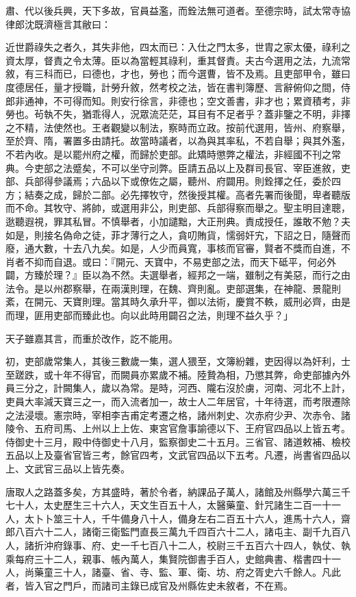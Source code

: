 \begin{pinyinscope}
 肅、代以後兵興，天下多故，官員益濫，而銓法無可道者。至德宗時，試太常寺協律郎沈既濟極言其敝曰：



 近世爵祿失之者久，其失非他，四太而已：入仕之門太多，世胄之家太優，祿利之資太厚，督責之令太薄。臣以為當輕其祿利，重其督責。夫古今選用之法，九流常敘，有三科而已，曰德也，才也，勞也；而今選曹，皆不及焉。且吏部甲令，雖曰度德居任，量才授職，計勞升敘，然考校之法，皆在書判簿歷、言辭俯仰之間，侍郎非通神，不可得而知。則安行徐言，非德也；空文善書，非才也；累資積考，非勞也。茍執不失，猶乖得人，況眾流茫茫，耳目有不足者乎？蓋非鑒之不明，非擇之不精，法使然也。王者觀變以制法，察時而立政。按前代選用，皆州、府察舉，至於齊、隋，署置多由請托。故當時議者，以為與其率私，不若自舉；與其外濫，不若內收。是以罷州府之權，而歸於吏部。此矯時懲弊之權法，非經國不刊之常典。今吏部之法蹙矣，不可以坐守刓弊。臣請五品以上及群司長官、宰臣進敘，吏部、兵部得參議焉；六品以下或僚佐之屬，聽州、府闢用。則銓擇之任，委於四方；結奏之成，歸於二部。必先擇牧守，然後授其權。高者先署而後聞，卑者聽版而不命。其牧守、將帥，或選用非公，則吏部、兵部得察而舉之。聖主明目達聰，逖聽遐視，罪其私冒。不慎舉者，小加譴黜，大正刑典。責成授任，誰敢不勉？夫如是，則接名偽命之徒，菲才薄行之人，貪叨賄貨，懦弱奸宄，下詔之日，隨聲而廢，通大數，十去八九矣。如是，人少而員寬，事核而官審，賢者不獎而自進，不肖者不抑而自退。或曰：『開元、天寶中，不易吏部之法，而天下砥平，何必外闢，方臻於理？』臣以為不然。夫選舉者，經邦之一端，雖制之有美惡，而行之由法令。是以州郡察舉，在兩漢則理，在魏、齊則亂。吏部選集，在神龍、景龍則紊，在開元、天寶則理。當其時久承升平，御以法術，慶賞不軼，威刑必齊，由是而理，匪用吏部而臻此也。向以此時用闢召之法，則理不益久乎？」



 天子雖嘉其言，而重於改作，訖不能用。



 初，吏部歲常集人，其後三數歲一集，選人猥至，文簿紛雜，吏因得以為奸利，士至蹉跌，或十年不得官，而闕員亦累歲不補。陸贄為相，乃懲其弊，命吏部據內外員三分之，計闕集人，歲以為常。是時，河西、隴右沒於虜，河南、河北不上計，吏員大率減天寶三之一，而入流者加一，故士人二年居官，十年待選，而考限遷除之法浸壞。憲宗時，宰相李吉甫定考遷之格，諸州刺史、次赤府少尹、次赤令、諸陵令、五府司馬、上州以上上佐、東宮官詹事諭德以下、王府官四品以上皆五考。侍御史十三月，殿中侍御史十八月，監察御史二十五月。三省官、諸道敕補、檢校五品以上及臺省官皆三考，餘官四考，文武官四品以下五考。凡遷，尚書省四品以上、文武官三品以上皆先奏。



 唐取人之路蓋多矣，方其盛時，著於令者，納課品子萬人，諸館及州縣學六萬三千七十人，太史歷生三十六人，天文生百五十人，太醫藥童、針咒諸生二百一十一人，太卜卜筮三十人，千牛備身八十人，備身左右二百五十六人，進馬十六人，齋郎八百六十二人，諸衛三衛監門直長三萬九千四百六十二人，諸屯主、副千九百八人，諸折沖府錄事、府、史一千七百八十二人，校尉三千五百六十四人，執仗、執乘每府三十二人，親事、帳內萬人，集賢院御書手百人，史館典書、楷書四十一人，尚藥童三十人，諸臺、省、寺、監、軍、衛、坊、府之胥史六千餘人。凡此者，皆入官之門戶，而諸司主錄已成官及州縣佐史未敘者，不在焉。




\end{pinyinscope}
